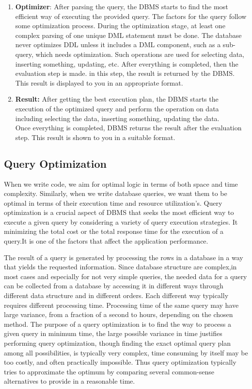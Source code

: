 \begin{enumerate}
    \item \textbf{Optimizer}: After parsing the query, the DBMS starts to find the most efficient way of executing the provided query. The factors for the query follow some optimization process. During the optimization stage, at least one complex parsing of one unique DML statement must be done. The database never optimizes DDL unless it includes a DML component, such as a sub-query, which needs optimization. Such operations are used for selecting data, inserting something, updating, etc. After everything is completed, then the evaluation step is made. in this step, the result is returned by the DBMS. This result is displayed to you in an appropriate format.
    \item \textbf{Result:} After getting the best execution plan, the DBMS starts the execution of the optimized query and perform the operation on data including selecting the data, inserting something, updating the data.\\
    Once everything is completed, DBMS returns the result after the evaluation step. This result is shown to you in a suitable format.\cite{Query,QueryProcessing,Oracle}
\end{enumerate}

\subsection{Query Optimization }When we write code, we aim for optimal logic in terms of both space and time complexity. Similarly, when we write database queries, we want them to be optimal in terms of their execution time and resource utilization's. Query optimization is  a crucial aspect of DBMS that seeks the most efficient way to execute a given query by considering a variety of query execution strategies. It minimizing the total cost or the total response time for the execution of a query.It is one of the factors that affect the application performance.\vspace{.4cm}

The result of a query is generated by processing the rows in a database in a way that yields the requested information. Since database structure are complex,in most cases and especially for not very simple queries, the needed data for a query can be collected from a database by accessing it  in different ways through different data structure and in different orders\cite{selinger-1979}. Each different way typically requires different processing time. Processing time of the same query may have large variance, from a fraction of a second to hours, depending on the chosen method. The purpose of a query optimization is to find the way to process a given query in minimum time, the large possible variance in time justifies performing query optimization, though finding the exact optimal query plan among all possibilities, is typically very complex, time consuming by itself may be too costly, and often practically impossible. Thus query optimization typically tries to approximate the optimum by comparing several common-sense alternatives to provide in a reasonable time.\vspace{.4cm}

